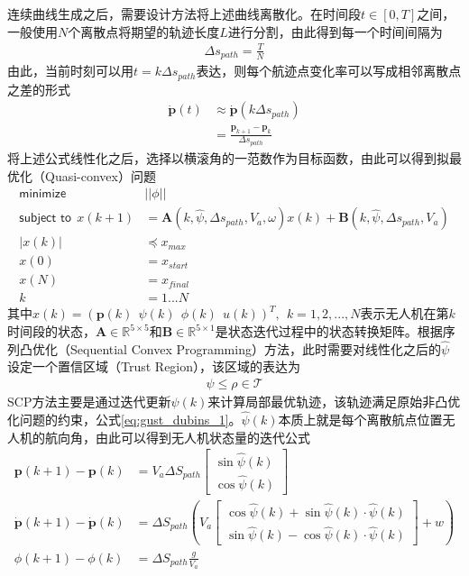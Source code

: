 连续曲线生成之后，需要设计方法将上述曲线离散化。在时间段$t \in [0, T]$之间，一般使用$N$个离散点将期望的轨迹长度$L$进行分割，由此得到每一个时间间隔为
\begin{align}
\Delta s_{path} = \frac{T}{N}
\end{align}
由此，当前时刻可以用$t =k \Delta s_{path}$表达，则每个航迹点变化率可以写成相邻离散点之差的形式
\begin{align}
\dot{\mathbf{p}}(t) &\approx \dot{\mathbf{p}}(k \Delta s_{path}) \\
&= \frac{\mathbf{p}_{k+1}-\mathbf{p}_{k}}{\Delta s_{path}}
\end{align}
将上述公式线性化之后，选择以横滚角的一范数作为目标函数，由此可以得到拟最优化（Quasi-convex）问题
\begin{align}
\textsf{minimize}\ \ &||\phi|| \\
\textsf{subject to}\  \ x(k+1) &= \mathbf{A}(k, \hat{\psi}, \Delta s_{path}, {V}_a, \omega)x(k) + \mathbf{B}(k, \hat{\psi}, \Delta s_{path}, {V}_a) \nonumber  \\
|x(k)| & \preceq x_{max} \nonumber \\
x(0) &= x_{start} \nonumber \\
x(N) &= x_{final} \nonumber \\
k &= 1... N \nonumber
\end{align}
其中$x(k) = (\mathbf{p}(k)\ \ \psi(k)\ \ \phi(k)\ \ u(k))^T,\ \ k=1,2,...,N$表示无人机在第$k$时间段的状态，$\mathbf{A} \in \mathbb{R}^{5\times5}$和$\mathbf{B} \in \mathbb{R}^{5\times1}$是状态迭代过程中的状态转换矩阵。根据序列凸优化（Sequential Convex Programming）方法，此时需要对线性化之后的$\hat\psi$设定一个置信区域（Trust Region），该区域的表达为
\begin{align}
\psi \le \rho \in \mathcal{T}
\end{align}
SCP方法主要是通过迭代更新$\hat{\psi}(k)$来计算局部最优轨迹，该轨迹满足原始非凸优化问题的约束，公式\ref{eq:gust_dubins_1}。$\hat{\psi}(k)$本质上就是每个离散航点位置无人机的航向角，由此可以得到无人机状态量的迭代公式
\begin{align}
\mathbf{p}(k+1) - \mathbf{p}(k)  &= V_a \Delta S_{path} \begin{bmatrix} \sin \hat{\psi}(k) \\ \cos\hat{\psi}(k)   \end{bmatrix} \\
\dot{\mathbf{p}}(k+1) - \dot{\mathbf{p}}(k) &=  \Delta S_{path} (V_a \begin{bmatrix} \cos \hat{\psi}(k) + \sin \hat{\psi}(k)\cdot \hat{\psi}(k) \\ \sin \hat{\psi}(k) - \cos \hat{\psi}(k)\cdot \hat{\psi}(k)  \end{bmatrix} + w) \\
\phi(k+1) - \phi(k) &=   \Delta S_{path}  \frac{g}{V_a} 
\end{align}

